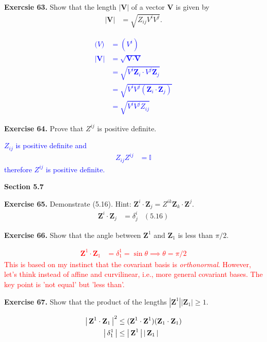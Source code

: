 \documentclass[12pt,a4paper]{report}
\newcommand{\RED}[1]{\textcolor{red}{#1}}
\newcommand{\BLUE}[1]{\textcolor{blue}{#1}}
\newcommand{\VK}[1]{\textbf{#1}}
\begin{document}
\begin{description}
\item \textbf{Exercsie 63.}  Show that the length $|\VK{V}|$ of a vector $\VK{V}$ is given by \begin{align*}
	|\VK{V}| &= \sqrt{Z_{ij}V^iV^j}.
\end{align*}

\BLUE{\begin{align*}
	\VK(V) &= (V^i) \\
	|\VK{V}| &= \sqrt{\VK{V}\cdot\VK{V}} \\
	&= \sqrt{V^i\VK{Z}_i\cdot V^j\VK{Z}_j}\\
	&= \sqrt{V^iV^j(\VK{Z}_i\cdot \VK{Z}_j)}\\
	&= \sqrt{V^iV^j Z_{ij}}
\end{align*}
}

\item \textbf{Exercise 64.}  Prove that $Z^{ij}$ is positive definite.

\BLUE{$Z_{ij}$ is positive definite and
\begin{align*}
	Z_{ij}Z^{ij} &= \mathbb{I}
\end{align*}therefore $Z^{ij}$ is positive definite.
}

\textbf{Section 5.7}
\item \textbf{Exercise 65.}  Demonstrate (5.16).  Hint: $\VK{Z}^i\cdot \VK{Z}_j = Z^{ik}\VK{Z}_k\cdot\VK{Z}^j$.
\begin{align*}
	\VK{Z}^i\cdot \VK{Z}_j &= \delta^i_j & (5.16)
\end{align*}

\item \textbf{Exercise 66.}  Show that the angle between $\VK{Z}^1$ and $\VK{Z}_1$ is less than $\pi/2$.

\RED{\begin{align*}
	\VK{Z}^1\cdot\VK{Z}_1 &= \delta^1_1 = \sin \theta \implies \theta = \pi/2
\end{align*}This is based on my instinct that the covariant basis is \textit{orthonormal}.  However, let's think instead of affine and curvilinear, i.e., more general covariant bases.  The key point is 'not equal' but 'less than'.
}

\item \textbf{Exercise 67.}  Show that the product of the lengths $|\VK{Z}^1||\VK{Z}_1| \ge 1$.

\BLUE{\begin{align*}
	\BARS{\VK{Z}^1\cdot\VK{Z}_1}^2 &\le (\VK{Z}^1\cdot\VK{Z}^1)(\VK{Z}_1\cdot\VK{Z}_1)\\
	\BARS{\delta^1_1}&\le \BARS{\VK{Z}^1}\BARS{\VK{Z}_1}
\end{align*}
}


\end{description}
\end{document}
